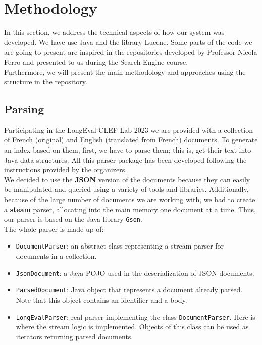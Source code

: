 \section{Methodology}\label{sec:methodology}
In this section, we address the technical aspects of how our system was developed.
We have use Java and the library Lucene.
Some parts of the code we are going to present are inspired in the repositories developed by Professor Nicola Ferro and
presented to us during the Search Engine course. \\
Furthermore, we will present the main methodology and approaches using the structure in the repository\cite{jihuming}.

\subsection{Parsing}\label{subsec:parsing}
Participating in the LongEval CLEF Lab 2023 we are provided with a collection of French (original) and English
(translated from French) documents.
To generate an index based on them, first, we have to parse them;
this is, get their text into Java data structures.
All this parser package has been developed following the instructions provided by the organizers.\\
We decided to use the \textbf{JSON} version of the documents because they can easily be manipulated and queried using a
variety of tools and libraries.
Additionally, because of the large number of documents we are working with, we had to create a \textbf{steam} parser,
allocating into the main memory one document at a time.
Thus, our parser is based on the Java library \texttt{Gson}.\\
The whole parser is made up of:
\begin{itemize}
    \item \texttt{DocumentParser}: an abstract class representing a stream parser for documents in a collection.
    \item \texttt{JsonDocument}: a Java POJO used in the deserialization of JSON documents.
    \item \texttt{ParsedDocument}: Java object that represents a document already parsed.
Note that this object contains an identifier and a body.
    \item \texttt{LongEvalParser}: real parser implementing the class \texttt{DocumentParser}.
Here is where the stream logic is implemented.
Objects of this class can be used as iterators returning parsed documents.
\end{itemize}

